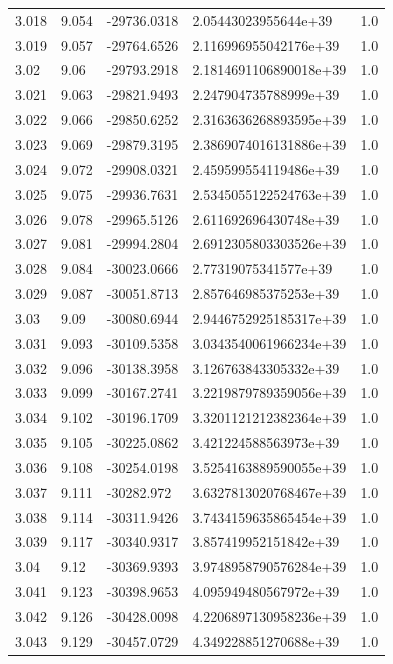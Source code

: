 \begin{tabular}{lllll}
3.018 & 9.054 & -29736.0318 & 2.05443023955644e+39 & 1.0 \\
3.019 & 9.057 & -29764.6526 & 2.116996955042176e+39 & 1.0 \\
3.02 & 9.06 & -29793.2918 & 2.1814691106890018e+39 & 1.0 \\
3.021 & 9.063 & -29821.9493 & 2.247904735788999e+39 & 1.0 \\
3.022 & 9.066 & -29850.6252 & 2.3163636268893595e+39 & 1.0 \\
3.023 & 9.069 & -29879.3195 & 2.3869074016131886e+39 & 1.0 \\
3.024 & 9.072 & -29908.0321 & 2.459599554119486e+39 & 1.0 \\
3.025 & 9.075 & -29936.7631 & 2.5345055122524763e+39 & 1.0 \\
3.026 & 9.078 & -29965.5126 & 2.611692696430748e+39 & 1.0 \\
3.027 & 9.081 & -29994.2804 & 2.6912305803303526e+39 & 1.0 \\
3.028 & 9.084 & -30023.0666 & 2.77319075341577e+39 & 1.0 \\
3.029 & 9.087 & -30051.8713 & 2.857646985375253e+39 & 1.0 \\
3.03 & 9.09 & -30080.6944 & 2.9446752925185317e+39 & 1.0 \\
3.031 & 9.093 & -30109.5358 & 3.0343540061966234e+39 & 1.0 \\
3.032 & 9.096 & -30138.3958 & 3.126763843305332e+39 & 1.0 \\
3.033 & 9.099 & -30167.2741 & 3.2219879789359056e+39 & 1.0 \\
3.034 & 9.102 & -30196.1709 & 3.3201121212382364e+39 & 1.0 \\
3.035 & 9.105 & -30225.0862 & 3.421224588563973e+39 & 1.0 \\
3.036 & 9.108 & -30254.0198 & 3.5254163889590055e+39 & 1.0 \\
3.037 & 9.111 & -30282.972 & 3.6327813020768467e+39 & 1.0 \\
3.038 & 9.114 & -30311.9426 & 3.7434159635865454e+39 & 1.0 \\
3.039 & 9.117 & -30340.9317 & 3.857419952151842e+39 & 1.0 \\
3.04 & 9.12 & -30369.9393 & 3.9748958790576284e+39 & 1.0 \\
3.041 & 9.123 & -30398.9653 & 4.095949480567972e+39 & 1.0 \\
3.042 & 9.126 & -30428.0098 & 4.2206897130958236e+39 & 1.0 \\
3.043 & 9.129 & -30457.0729 & 4.349228851270688e+39 & 1.0 \\

\end{tabular}
